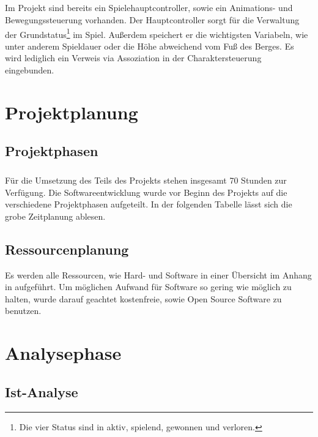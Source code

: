 \paragraph{}
Im Projekt sind bereits ein Spielehauptcontroller, sowie ein Animations- und Bewegungssteuerung vorhanden.
Der Hauptcontroller sorgt für die Verwaltung der Grundstatus\footnote{Die vier Status sind in aktiv, spielend, gewonnen und verloren.} im Spiel. Außerdem speichert er die wichtigsten Variabeln, wie unter anderem Spieldauer oder die Höhe abweichend vom Fuß des Berges. Es wird lediglich ein Verweis via Assoziation in der Charaktersteuerung eingebunden.

\chapter{Projektplanung}
\section{Projektphasen}
\paragraph{}
Für die Umsetzung des Teils des Projekts stehen insgesamt 70 Stunden zur Verfügung. Die Softwareentwicklung wurde vor Beginn des Projekts auf die verschiedene Projektphasen aufgeteilt. In der folgenden Tabelle  lässt sich die grobe Zeitplanung ablesen.\\


\section{Ressourcenplanung}
Es werden alle Ressourcen, wie Hard- und Software in einer Übersicht im Anhang in  aufgeführt. Um möglichen Aufwand für Software so gering wie möglich zu halten, wurde darauf geachtet kostenfreie, sowie Open Source Software zu benutzen.

\chapter{Analysephase}
\section{Ist-Analyse}
